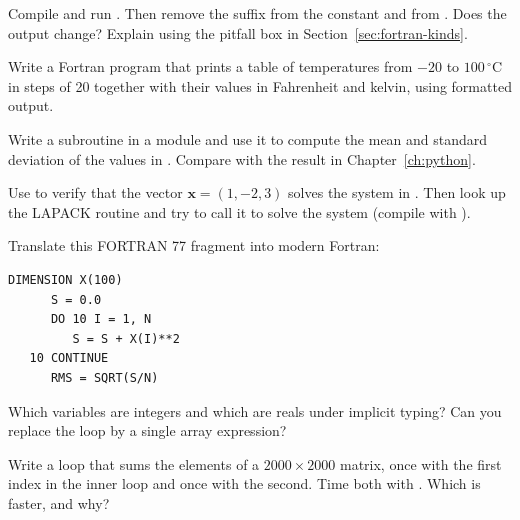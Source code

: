 \begin{exercises}
\item Compile and run . Then remove the  suffix from the
  constant  and from . Does the output change? Explain
  using the pitfall box in Section~\ref{sec:fortran-kinds}.
\item Write a Fortran program that prints a table of temperatures from $-20$ to
  $100\,^\circ$C in steps of 20 together with their values in Fahrenheit and kelvin, using
  formatted output.
\item Write a subroutine  in a module and use it to compute the
  mean and standard deviation of the values in . Compare with the \py
  result in Chapter~\ref{ch:python}.
\item Use  to verify that the vector $\mathbf{x} = (1, -2, 3)$ solves the
  system in . Then look up the LAPACK routine  and try to call
  it to solve the system (compile with ).
\item Translate this FORTRAN 77 fragment into modern Fortran:
\begin{lstlisting}[language={[77]Fortran}]
      DIMENSION X(100)
      S = 0.0
      DO 10 I = 1, N
         S = S + X(I)**2
   10 CONTINUE
      RMS = SQRT(S/N)
\end{lstlisting}
  Which variables are integers and which are reals under implicit typing? Can you replace
  the loop by a single array expression?
\item Write a loop that sums the elements of a $2000\times2000$ matrix, once with the first
  index in the inner loop and once with the second. Time both with . Which is
  faster, and why?
\end{exercises}
